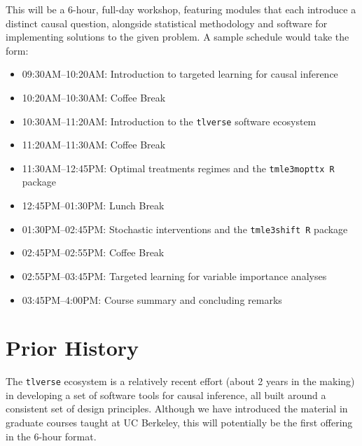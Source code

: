\documentclass[a4paper,11pt]{texMemo}
\begin{document}
This will be a 6-hour, full-day workshop, featuring modules that each introduce
a distinct causal question, alongside statistical methodology and software for
implementing solutions to the given problem. A sample schedule would take the
form:
\begin{itemize}
  \itemsep0pt
  \item 09:30AM--10:20AM: Introduction to targeted learning for causal inference
  \item 10:20AM--10:30AM: Coffee Break
  \item 10:30AM--11:20AM: Introduction to the \texttt{tlverse} software
    ecosystem
  \item 11:20AM--11:30AM: Coffee Break
  \item 11:30AM--12:45PM: Optimal treatments regimes and the
    \texttt{tmle3mopttx R} package
  \item 12:45PM--01:30PM: Lunch Break
  \item 01:30PM--02:45PM: Stochastic interventions and the \texttt{tmle3shift R}
    package
  \item 02:45PM--02:55PM: Coffee Break
  \item 02:55PM--03:45PM: Targeted learning for variable importance analyses
  \item 03:45PM--4:00PM: Course summary and concluding remarks
\end{itemize}

\section{Prior History}

The \texttt{tlverse} ecosystem is a relatively recent effort (about 2 years in
the making) in developing a set of software tools for causal inference, all
built around a consistent set of design principles. Although we have introduced
the material in graduate courses taught at UC Berkeley, this will potentially be
the first offering in the 6-hour format.
\end{document}
